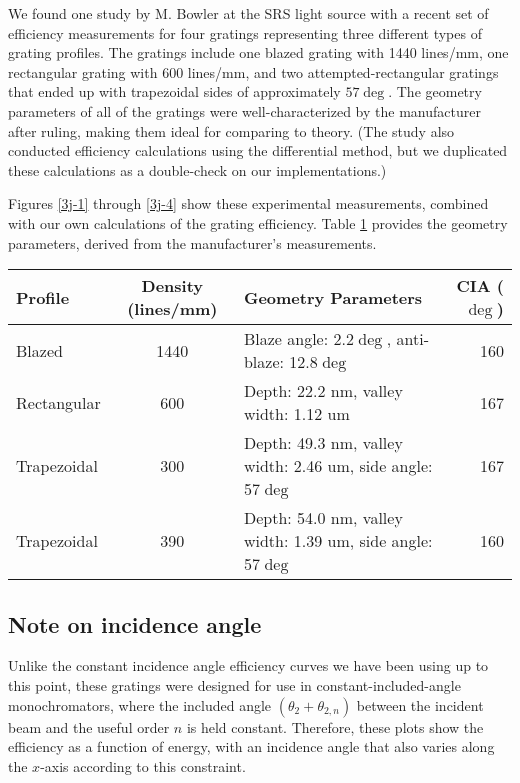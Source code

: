  We found one study by M. Bowler at the SRS light source \cite{Bow01} with a recent set of efficiency measurements for four gratings representing three different types of grating profiles.  The gratings include one blazed grating with 1440 lines/mm, one rectangular grating with 600 lines/mm, and two attempted-rectangular gratings that ended up with trapezoidal sides of approximately $57\deg$.  The geometry parameters of all of the gratings were well-characterized by the manufacturer after ruling, making them ideal for comparing to theory.  (The study also conducted efficiency calculations using the differential method, but we duplicated these calculations as a double-check on our implementations.)

Figures \ref{3j-1} through \ref{3j-4} show these experimental measurements, combined with our own calculations of the grating efficiency.  Table \ref{3j-table} provides the geometry parameters, derived from the manufacturer's measurements.

\begin{table}[htbp]
\centering
{}
{\footnotesize
\begin{tabularx}{\textwidth}{@{} l c l r @{}} %
\toprule
Profile    &  Density (lines/mm)& Geometry Parameters & CIA ($\deg$)\\
\midrule
Blazed & 1440 & Blaze angle: 2.2$\deg$, anti-blaze: 12.8$\deg$ & 160 \\
Rectangular & 600 & Depth: 22.2 nm, valley width: 1.12 um & 167 \\
Trapezoidal & 300 & Depth: 49.3 nm, valley width: 2.46 um, side angle: 57$\deg$ & 167\\
Trapezoidal & 390 & Depth: 54.0 nm, valley width: 1.39 um, side angle: 57$\deg$ & 160\\
\bottomrule
\end{tabularx}
}
\label{3j-table}
\end{table}

\subsection{Note on incidence angle}
Unlike the constant incidence angle efficiency curves we have been using up to this point, these gratings were designed for use in constant-included-angle monochromators, where the included angle $(\theta_2 + \theta_{2,n})$ between the incident beam and the useful order $n$ is held constant.  
Therefore, these plots show the efficiency as a function of energy, with an incidence angle that also varies along the $x$-axis according to this constraint.

